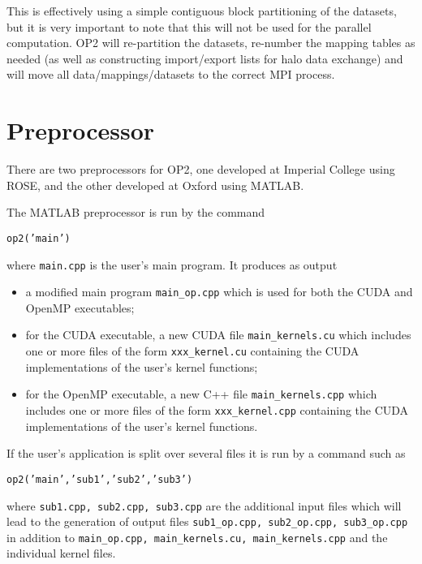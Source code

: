 \documentclass[11pt]{article}
\begin{document}
This is effectively using a simple contiguous block partitioning of the datasets,
but it is very important to note that this will not be used for the parallel
computation.  OP2 will re-partition the datasets,
re-number the mapping tables as needed (as well as constructing import/export
lists for halo data exchange) and will move all data/mappings/datasets to the
correct MPI process.


\newpage


\section{Preprocessor}

There are two preprocessors for OP2, one developed at Imperial College using ROSE,
and the other developed at Oxford using MATLAB.

The MATLAB preprocessor is run by the command

{\tt op2('main')}

\noindent
where {\tt main.cpp} is the user's main program.  It produces as output
\begin{itemize}
\item
a modified main program {\tt main\_op.cpp} which is used for both the
CUDA and OpenMP executables;
\item
for the CUDA executable, a new CUDA file {\tt main\_kernels.cu} which
includes one or more files of the form {\tt xxx\_kernel.cu} containing
the CUDA implementations of the user's kernel functions;
\item
for the OpenMP executable, a new C++ file {\tt main\_kernels.cpp} which
includes one or more files of the form {\tt xxx\_kernel.cpp} containing
the CUDA implementations of the user's kernel functions.
\end{itemize}

If the user's application is split over several files it is run by a command such as

{\tt op2('main','sub1','sub2','sub3')}

\noindent
where {\tt sub1.cpp, sub2.cpp, sub3.cpp} are the additional input files which will
lead to the generation of output files {\tt sub1\_op.cpp, sub2\_op.cpp, sub3\_op.cpp}
in addition to {\tt main\_op.cpp, main\_kernels.cu, main\_kernels.cpp}
and the individual kernel files.
\end{document}
